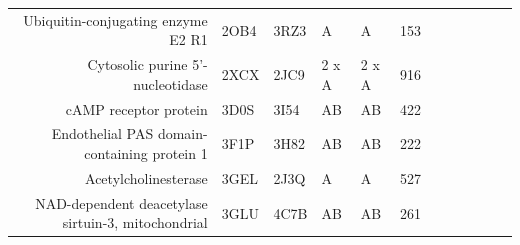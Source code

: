 \begin{table}
\begin{scriptsize}
\begin{tabular}{rrrrrrrrrrrr}
\multicolumn{1}{r}{Ubiquitin-conjugating enzyme E2 R1} & \multicolumn{1}{l}{2OB4} & \multicolumn{1}{l}{3RZ3} & \multicolumn{1}{l}{A} & \multicolumn{1}{l}{A} & 153   & \cellcolor[rgb]{ .573,  .816,  .314}  & \cellcolor[rgb]{ .573,  .816,  .314}  & \cellcolor[rgb]{ 1,  1,  0}  & \cellcolor[rgb]{ .573,  .816,  .314}  & \cellcolor[rgb]{ .573,  .816,  .314}  & \cellcolor[rgb]{ .573,  .816,  .314}  \\
\multicolumn{1}{r}{Cytosolic purine 5'-nucleotidase} & \multicolumn{1}{l}{2XCX} & \multicolumn{1}{l}{2JC9} & \multicolumn{1}{l}{2 x A} & \multicolumn{1}{l}{2 x A} & 916   & \cellcolor[rgb]{ .573,  .816,  .314}  & \cellcolor[rgb]{ 1,  .494,  .475}  & \cellcolor[rgb]{ 1,  .494,  .475}  & \cellcolor[rgb]{ 1,  .494,  .475}  & \cellcolor[rgb]{ .573,  .816,  .314}  & \cellcolor[rgb]{ 1,  .494,  .475}  \\
\multicolumn{1}{r}{cAMP receptor protein} & \multicolumn{1}{l}{3D0S} & \multicolumn{1}{l}{3I54} & \multicolumn{1}{l}{AB} & \multicolumn{1}{l}{AB} & 422   & \cellcolor[rgb]{ .573,  .816,  .314}  & \cellcolor[rgb]{ .573,  .816,  .314}  & \cellcolor[rgb]{ .573,  .816,  .314}  & \cellcolor[rgb]{ .573,  .816,  .314}  & \cellcolor[rgb]{ .573,  .816,  .314}  & \cellcolor[rgb]{ .573,  .816,  .314}  \\
\multicolumn{1}{r}{Endothelial PAS domain-containing protein 1} & \multicolumn{1}{l}{3F1P} & \multicolumn{1}{l}{3H82} & \multicolumn{1}{l}{AB} & \multicolumn{1}{l}{AB} & 222   & \cellcolor[rgb]{ 1,  .494,  .475}  & \cellcolor[rgb]{ .573,  .816,  .314}  & \cellcolor[rgb]{ 1,  .494,  .475}  & \cellcolor[rgb]{ .573,  .816,  .314}  & \cellcolor[rgb]{ .573,  .816,  .314}  & \cellcolor[rgb]{ .573,  .816,  .314}  \\
\multicolumn{1}{r}{Acetylcholinesterase} & \multicolumn{1}{l}{3GEL} & \multicolumn{1}{l}{2J3Q} & \multicolumn{1}{l}{A} & \multicolumn{1}{l}{A} & 527   & \cellcolor[rgb]{ 1,  .494,  .475}  & \cellcolor[rgb]{ 1,  .494,  .475}  & \cellcolor[rgb]{ 1,  .494,  .475}  & \cellcolor[rgb]{ .573,  .816,  .314}  & \cellcolor[rgb]{ .573,  .816,  .314}  & \cellcolor[rgb]{ .573,  .816,  .314}  \\
\multicolumn{1}{r}{NAD-dependent deacetylase sirtuin-3, mitochondrial} & \multicolumn{1}{l}{3GLU} & \multicolumn{1}{l}{4C7B} & \multicolumn{1}{l}{AB} & \multicolumn{1}{l}{AB} & 261   & \cellcolor[rgb]{ .573,  .816,  .314}  & \cellcolor[rgb]{ 1,  .494,  .475}  & \cellcolor[rgb]{ .573,  .816,  .314}  & \cellcolor[rgb]{ .573,  .816,  .314}  & \cellcolor[rgb]{ .573,  .816,  .314}  & \cellcolor[rgb]{ .573,  .816,  .314}  \\

\end{tabular}
\end{scriptsize}
\end{table}
